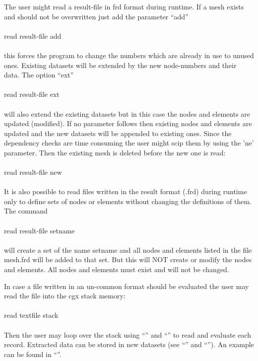 \documentclass{article}
\begin{document}
The user might read a result-file in frd format during runtime. If a mesh exists and should not be overwritten just add the parameter ``add''\\\\read result-file add\\\\this forces the program to change the numbers which are already in use to unused ones. Existing datasets will be extended by the new node-numbers and their data. The option ``ext'' \\\\read result-file ext\\\\will also extend the existing datasets but in this case the nodes and elements are updated (modified). If no parameter follows then existing nodes and elements are updated and the new datasets will be appended to existing ones. Since the dependency checks are time consuming the user might scip them by using the 'ne' parameter. Then the existing mesh is deleted before the new one is read:\\\\read result-file new\\\\

It is also possible to read files written in the result format (.frd) during runtime only to define sets of nodes or elements without changing the definitions of them. The command\\\\read result-file setname\\\\will create a set of the name setname and all nodes and elements listed in the file mesh.frd will be added to that set. But this will NOT create or modify the nodes and elements. All nodes and elements must exist and will not be changed.

In case a file written in an un-common format should be evaluated the user may read the file into the cgx stack memory:\\\\read textfile stack\\\\ Then the user may loop over the stack using ``'' and ``'' to read and evaluate each record. Extracted data can be stored in new datasets (see ``'' and ``''). An example can be found in ``''.
\end{document}
